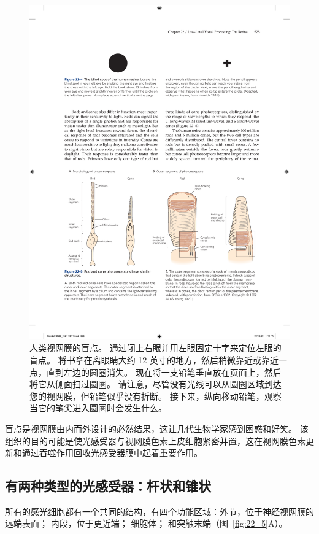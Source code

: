 \begin{figure}[htbp]
	\centering
	\includegraphics[width=0.7\linewidth]{chap22/fig_22_4}
	\caption{人类视网膜的盲点。
		通过闭上右眼并用左眼固定十字来定位左眼的盲点。
		将书拿在离眼睛大约 12 英寸的地方，然后稍微靠近或靠近一点，直到左边的圆圈消失。 
		现在将一支铅笔垂直放在页面上，然后将它从侧面扫过圆圈。 
		请注意，尽管没有光线可以从圆圈区域到达您的视网膜，但铅笔似乎没有折断。 
		接下来，纵向移动铅笔，观察当它的笔尖进入圆圈时会发生什么\cite{hurvich1981color}。}
	\label{fig:22_4}
\end{figure}


盲点是视网膜由内而外设计的必然结果，这让几代生物学家感到困惑和好笑。
该组织的目的可能是使光感受器与视网膜色素上皮细胞紧密并置，这在视网膜色素更新和通过吞噬作用回收光感受器膜中起着重要作用。


\subsection{有两种类型的光感受器：杆状和锥状}

所有的感光细胞都有一个共同的结构，有四个功能区域：外节，位于神经视网膜的远端表面；
内段，位于更近端； 细胞体；
和突触末端（图~\ref{fig:22_5}A）。


